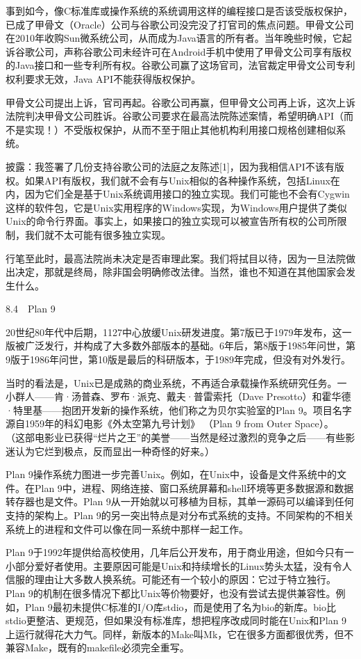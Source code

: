 \documentclass[a4paper,12pt,UTF8,twoside]{ctexbook}
\begin{document}
事到如今，像C标准库或操作系统的系统调用这样的编程接口是否该受版权保护，已成了甲骨文（Oracle）公司与谷歌公司没完没了打官司的焦点问题。甲骨文公司在2010年收购Sun微系统公司，从而成为Java语言的所有者。当年晚些时候，它起诉谷歌公司，声称谷歌公司未经许可在Android手机中使用了甲骨文公司享有版权的Java接口和一些专利所有权。谷歌公司赢了这场官司，法官裁定甲骨文公司专利权利要求无效，Java API不能获得版权保护。

甲骨文公司提出上诉，官司再起。谷歌公司再赢，但甲骨文公司再上诉，这次上诉法院判决甲骨文公司胜诉。谷歌公司要求在最高法院陈述案情，希望明确API（而不是实现！）不受版权保护，从而不至于阻止其他机构利用接口规格创建相似系统。

披露：我签署了几份支持谷歌公司的法庭之友陈述[1]，因为我相信API不该有版权。如果API有版权，我们就不会有与Unix相似的各种操作系统，包括Linux在内，因为它们全是基于Unix系统调用接口的独立实现。我们可能也不会有Cygwin这样的软件包，它是Unix实用程序的Windows实现，为Windows用户提供了类似Unix的命令行界面。事实上，如果接口的独立实现可以被宣告所有权的公司所限制，我们就不太可能有很多独立实现。

行笔至此时，最高法院尚未决定是否审理此案。我们将拭目以待，因为一旦法院做出决定，那就是终局，除非国会明确修改法律。当然，谁也不知道在其他国家会发生什么。





8.4　Plan 9


20世纪80年代中后期，1127中心放缓Unix研发进度。第7版已于1979年发布，这一版被广泛发行，并构成了大多数外部版本的基础。6年后，第8版于1985年问世，第9版于1986年问世，第10版是最后的科研版本，于1989年完成，但没有对外发行。

当时的看法是，Unix已是成熟的商业系统，不再适合承载操作系统研究任务。一小群人——肯·汤普森、罗布·派克、戴夫·普雷索托（Dave Presotto）和霍华德·特里基——抱团开发新的操作系统，他们称之为贝尔实验室的Plan 9。项目名字源自1959年的科幻电影《外太空第九号计划》 （Plan 9 from Outer Space）。 （这部电影业已获得“烂片之王”的美誉——当然是经过激烈的竞争之后——有些影迷认为它烂到极点，反而显出一种奇怪的好来。）

Plan 9操作系统力图进一步完善Unix。例如，在Unix中，设备是文件系统中的文件。在Plan 9中，进程、网络连接、窗口系统屏幕和shell环境等更多数据源和数据转存器也是文件。Plan 9从一开始就以可移植为目标，其单一源码可以编译到任何支持的架构上。Plan 9的另一突出特点是对分布式系统的支持。不同架构的不相关系统上的进程和文件可以像在同一系统中那样一起工作。

Plan 9于1992年提供给高校使用，几年后公开发布，用于商业用途，但如今只有一小部分爱好者使用。主要原因可能是Unix和持续增长的Linux势头太猛，没有令人信服的理由让大多数人换系统。可能还有一个较小的原因：它过于特立独行。Plan 9的机制在很多情况下都比Unix等价物要好，也没有尝试去提供兼容性。例如，Plan 9最初未提供C标准的I/O库stdio，而是使用了名为bio的新库。bio比stdio更整洁、更规范，但如果没有标准库，想把程序改成同时能在Unix和Plan 9上运行就得花大力气。同样，新版本的Make叫Mk，它在很多方面都很优秀，但不兼容Make，既有的makefile必须完全重写。
\end{document}
